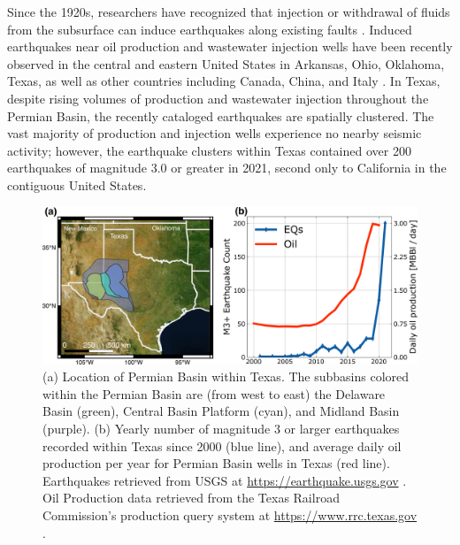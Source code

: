 Since the 1920s, researchers have recognized that injection or withdrawal of fluids from the subsurface can induce earthquakes along existing faults \citep{Council2013InducedSeismicityPotential, Simpson1988TwoTypesReservoir, Ellsworth2013InjectionInducedEarthquakes}.  Induced earthquakes near oil production and wastewater injection wells have been recently observed in the central and eastern United States in Arkansas, Ohio, Oklahoma, Texas, as well as other countries including Canada, China, and Italy \citep{Foulger2018GlobalReviewHuman}.  In Texas, despite rising volumes of production and wastewater injection throughout the Permian Basin, the recently cataloged earthquakes are spatially clustered. The vast majority of production and injection wells experience no nearby seismic activity; however, the earthquake clusters within Texas contained over 200 earthquakes of magnitude 3.0 or greater in 2021, second only to California in the contiguous United States.


\begin{figure}
	\centering
	\includegraphics[width=\columnwidth]{figures/permian-overview-eqs-oil.pdf}
	\caption[Permian Basin oil production and earthquakes]{
		(a) Location of Permian Basin within Texas. The subbasins colored within the Permian Basin are (from west to east) the Delaware Basin (green), Central Basin Platform (cyan), and Midland Basin (purple).
		(b) Yearly number of magnitude 3 or larger earthquakes recorded within Texas since 2000 (blue line), and average daily oil production per year for Permian Basin wells in Texas (red line).
		Earthquakes retrieved from USGS at \url{https://earthquake.usgs.gov} . Oil Production data retrieved from the Texas Railroad Commission's production query system at \url{https://www.rrc.texas.gov} .
	}
	\label{fig:permian-overview}
\end{figure}




